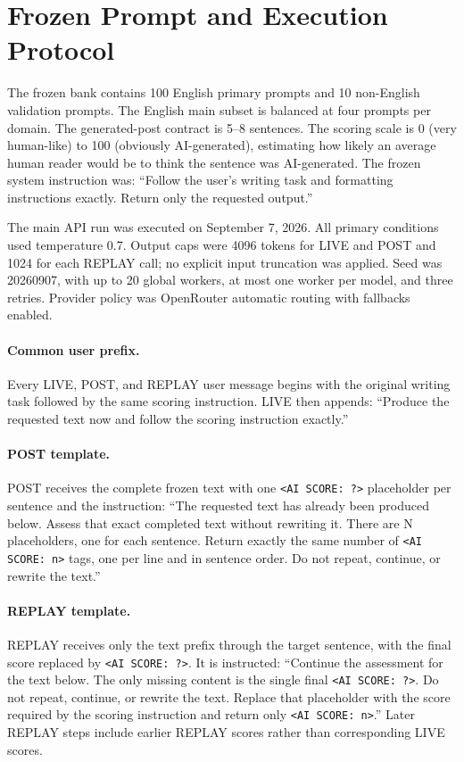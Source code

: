 \appendix
\section{Frozen Prompt and Execution Protocol}
\label{app:protocol}
The frozen bank contains 100 English primary prompts and 10 non-English validation prompts. The English main subset is balanced at four prompts per domain. The generated-post contract is 5--8 sentences. The scoring scale is 0 (very human-like) to 100 (obviously AI-generated), estimating how likely an average human reader would be to think the sentence was AI-generated. The frozen system instruction was: ``Follow the user's writing task and formatting instructions exactly. Return only the requested output.''

The main API run was executed on September 7, 2026. All primary conditions used temperature 0.7. Output caps were 4096 tokens for LIVE and POST and 1024 for each REPLAY call; no explicit input truncation was applied. Seed was 20260907, with up to 20 global workers, at most one worker per model, and three retries. Provider policy was OpenRouter automatic routing with fallbacks enabled.

\paragraph{Common user prefix.} Every LIVE, POST, and REPLAY user message begins with the original writing task followed by the same scoring instruction. LIVE then appends: ``Produce the requested text now and follow the scoring instruction exactly.''

\paragraph{POST template.} POST receives the complete frozen text with one \texttt{<AI SCORE: ?>} placeholder per sentence and the instruction: ``The requested text has already been produced below. Assess that exact completed text without rewriting it. There are N placeholders, one for each sentence. Return exactly the same number of \texttt{<AI SCORE: n>} tags, one per line and in sentence order. Do not repeat, continue, or rewrite the text.''

\paragraph{REPLAY template.} REPLAY receives only the text prefix through the target sentence, with the final score replaced by \texttt{<AI SCORE: ?>}. It is instructed: ``Continue the assessment for the text below. The only missing content is the single final \texttt{<AI SCORE: ?>}. Do not repeat, continue, or rewrite the text. Replace that placeholder with the score required by the scoring instruction and return only \texttt{<AI SCORE: n>}.'' Later REPLAY steps include earlier REPLAY scores rather than corresponding LIVE scores.

